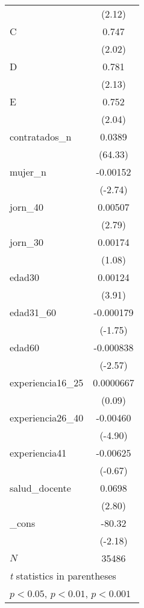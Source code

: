 {\begin{tabular}{l*{1}{c}}
            &      (2.12)         \\
[1em]
C           &       0.747\sym{*}  \\
            &      (2.02)         \\
[1em]
D           &       0.781\sym{*}  \\
            &      (2.13)         \\
[1em]
E           &       0.752\sym{*}  \\
            &      (2.04)         \\
[1em]
contratados\_n&      0.0389\sym{***}\\
            &     (64.33)         \\
[1em]
mujer\_n     &    -0.00152\sym{**} \\
            &     (-2.74)         \\
[1em]
jorn\_40     &     0.00507\sym{**} \\
            &      (2.79)         \\
[1em]
jorn\_30     &     0.00174         \\
            &      (1.08)         \\
[1em]
edad30      &     0.00124\sym{***}\\
            &      (3.91)         \\
[1em]
edad31\_60   &   -0.000179         \\
            &     (-1.75)         \\
[1em]
edad60      &   -0.000838\sym{*}  \\
            &     (-2.57)         \\
[1em]
experiencia16\_25&   0.0000667         \\
            &      (0.09)         \\
[1em]
experiencia26\_40&    -0.00460\sym{***}\\
            &     (-4.90)         \\
[1em]
experiencia41&    -0.00625         \\
            &     (-0.67)         \\
[1em]
salud\_docente&      0.0698\sym{**} \\
            &      (2.80)         \\
[1em]
\_cons      &      -80.32\sym{*}  \\
            &     (-2.18)         \\
\hline
\(N\)       &       35486         \\
\hline\hline
\multicolumn{2}{l}{\footnotesize \textit{t} statistics in parentheses}\\
\multicolumn{2}{l}{\footnotesize \sym{*} \(p<0.05\), \sym{**} \(p<0.01\), \sym{***} \(p<0.001\)}\\
\end{tabular}
}
